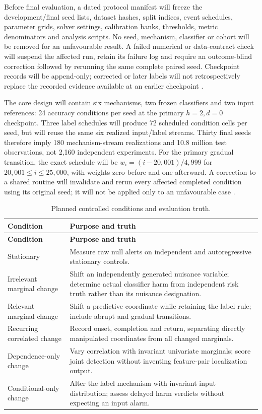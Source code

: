 Before final evaluation, a dated protocol manifest will freeze the development/final seed lists, dataset hashes, split indices, event schedules, parameter grids, solver settings, calibration banks, thresholds, metric denominators and analysis scripts. No seed, mechanism, classifier or cohort will be removed for an unfavourable result. A failed numerical or data-contract check will suspend the affected run, retain its failure log and require an outcome-blind correction followed by rerunning the same complete paired seed. Checkpoint records will be append-only; corrected or later labels will not retrospectively replace the recorded evidence available at an earlier checkpoint \cite{nist,awsjoin,souza}.

The core design will contain six mechanisms, two frozen classifiers and two input references: 24 accuracy conditions per seed at the primary $h=2,d=0$ checkpoint. Three label schedules will produce 72 scheduled condition cells per seed, but will reuse the same six realized input/label streams. Thirty final seeds therefore imply 180 mechanism-stream realizations and 10.8 million test observations, not 2,160 independent experiments. For the primary gradual transition, the exact schedule will be $w_i=(i-20{,}001)/4{,}999$ for $20{,}001\leq i\leq25{,}000$, with weights zero before and one afterward. A correction to a shared routine will invalidate and rerun every affected completed condition using its original seed; it will not be applied only to an unfavourable case \cite{souza,cerqueira}.

\begin{longtable}{L{4.2cm}L{11.7cm}}
\caption{Planned controlled conditions and evaluation truth.}\label{tab:conditions}\\
\toprule{}\textbf{Condition}&\textbf{Purpose and truth}\\\midrule\endfirsthead
\toprule{}\textbf{Condition}&\textbf{Purpose and truth}\\\midrule\endhead
\bottomrule\endlastfoot
Stationary & Measure raw null alerts on independent and autoregressive stationary controls.\\[3pt]
Irrelevant marginal change & Shift an independently generated nuisance variable; determine actual classifier harm from independent risk truth rather than its nuisance designation.\\[3pt]
Relevant marginal change & Shift a predictive coordinate while retaining the label rule; include abrupt and gradual transitions.\\[3pt]
Recurring correlated change & Record onset, completion and return, separating directly manipulated coordinates from all changed marginals.\\[3pt]
Dependence-only change & Vary correlation with invariant univariate marginals; score joint detection without inventing feature-pair localization output.\\[3pt]
Conditional-only change & Alter the label mechanism with invariant input distribution; assess delayed harm verdicts without expecting an input alarm.\\
\end{longtable}

